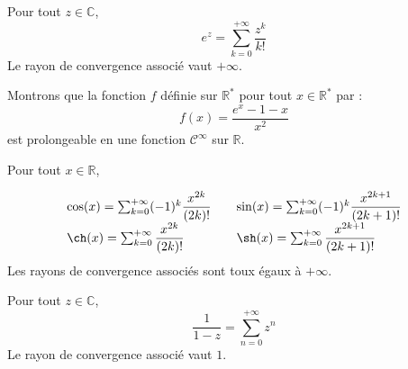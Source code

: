 \documentclass[french,11pt,twoside]{VcCours}
\begin{document}
\begin{Theoreme}{} Pour tout $z \in \mathbb{C}$,
$$ e^z = \sum_{k=0}^{+ \infty} \dfrac{z^k}{k!}$$
Le rayon de convergence associé vaut $+ \infty$.
\end{Theoreme}

\begin{Demonstration}{}
\vspace*{ 11cm}
\end{Demonstration}

\begin{Exemple}{} Montrons que la fonction $f$ définie sur $\mathbb{R}^*$ pour tout $x \in \mathbb{R}^*$ par :
$$ f(x) = \frac{e^x-1-x}{x^2}$$
est prolongeable en une fonction $\mathcal{C}^{\infty}$ sur $\mathbb{R}$.

\newpage

\vspace*{ 5cm}
\end{Exemple}

\begin{Corollaire}{} Pour tout $x \in \mathbb{R}$,

$$ \begin{array}{ll}
\cos(x) = \sum_{k=0}^{+ \infty} (-1)^k \dfrac{x^{2k}}{(2k)!} & \quad  \sin(x) = \sum_{k=0}^{+ \infty} (-1)^k \dfrac{x^{2k+1}}{(2k+1)!}\\
\ch(x) = \sum_{k=0}^{+ \infty} \dfrac{x^{2k}}{(2k)!} & \quad  \sh(x) = \sum_{k=0}^{+ \infty}  \dfrac{x^{2k+1}}{(2k+1)!} \end{array}$$
Les rayons de convergence associés sont toux égaux à $+ \infty$.
\end{Corollaire}

\begin{Demonstration}{}
\vspace*{ 6cm}

\end{Demonstration}

\begin{Proposition}{} Pour tout $z \in \mathbb{C}$,
$$ \dfrac{1}{1-z} = \sum_{n=0}^{+ \infty} z^n$$ 
Le rayon de convergence associé vaut $1$.
\end{Proposition}
\end{document}
